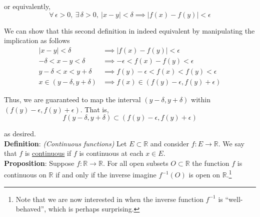\documentclass[12pt]{article}
\newlength\tindent
\renewcommand{\indent}{\hspace*{\tindent}}
\newcommand{\R}{\mathbb R}
\begin{document}
or equivalently,
\begin{equation*}
	\forall\,\epsilon > 0,~\exists\,\delta > 0,~|x - y| < \delta \implies |f(x) - f(y)| < \epsilon
\end{equation*} 

\indent We can show that this second definition in indeed equivalent by manipulating the implication as follows
\begin{align*}
	|x - y| < \delta &\implies |f(x) - f(y)| < \epsilon \\
	-\delta < x - y < \delta &\implies -\epsilon < f(x) - f(y) < \epsilon \\
	y - \delta < x < y + \delta &\implies f(y) - \epsilon < f(x) < f(y) < \epsilon \\
	x \in (y - \delta, y + \delta) &\implies f(x) \in (f(y) - \epsilon, f(y) + \epsilon)
\end{align*}

\indent Thus, we are guaranteed to map the interval $(y - \delta, y + \delta)$ within $(f(y) - \epsilon, f(y) + \epsilon)$. That is,
\begin{equation*}
	f(y - \delta, y + \delta) \subset (f(y) - \epsilon, f(y) + \epsilon)
\end{equation*} 

as desired. \\

%
%
{\bf Definition}: {\em (Continuous functions)} Let $E \subset \R$ and consider $f:E\to\R$. We say that $f$ is \underline{continuous} if $f$ is continuous at each $x \in E$.  \\

%
%
{\bf Proposition}: Suppose $f:\R\to\R$. For all open subsets $O \subset \R$ the function $f$ is continuous on $\R$ if and only if the inverse imagine $f^{-1}(O)$ is open on $\R$.\footnote{Note that we are now interested in when the inverse function $f^{-1}$ is ``well-behaved'', which is perhaps surprising.}
\end{document}
